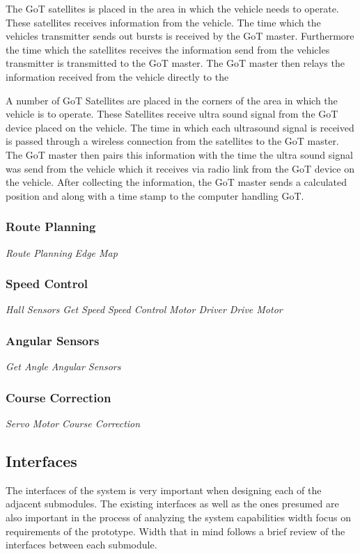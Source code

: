 The GoT satellites is placed in the area in which the vehicle needs to operate. These satellites receives information from the vehicle. The time which the vehicles transmitter sends out bursts is received by the GoT master. Furthermore the time which the satellites receives the information send from the vehicles transmitter is transmitted to the GoT master. The GoT master then relays the information received from the vehicle directly to the 

A number of GoT Satellites are placed in the corners of the area in which the vehicle is to operate. These Satellites receive ultra sound signal from the GoT device placed on the vehicle. The time in which each ultrasound signal is received is passed through a wireless connection from the satellites to the GoT master. The GoT master then pairs this information with the time the ultra sound signal was send from the vehicle which it receives via radio link from the GoT device on the vehicle. After collecting the information, the GoT master sends a calculated position and along with a time stamp to the computer handling GoT.

\subsubsection{Route Planning}
\textit{Route Planning} \textit{Edge Map}

\subsubsection{Speed Control}
\textit{Hall Sensors} \textit{Get Speed} \textit{Speed Control} \textit{Motor Driver} \textit{Drive Motor}

\subsubsection{Angular Sensors}
\textit{Get Angle} \textit{Angular Sensors}

\subsubsection{Course Correction}
\textit{Servo Motor} \textit{Course Correction}

\subsection{Interfaces}
The interfaces of the system is very important when designing each of the adjacent submodules. The existing interfaces as well as the ones presumed are also important in the process of analyzing the system capabilities width focus on requirements of the prototype. Width that in mind follows a brief review of the interfaces between each submodule.

